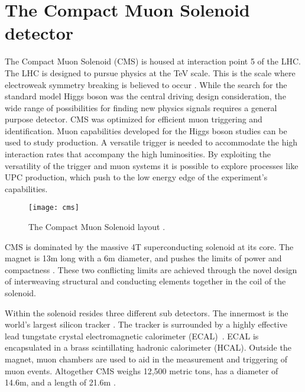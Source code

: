 \chapter{\label{ch:detector} The Compact Muon Solenoid detector}	
  The Compact Muon Solenoid (CMS) is housed at interaction point 5 of the 
    LHC. 
  The LHC is designed to pursue physics at the TeV scale. 
  This is the scale where electroweak symmetry breaking is believed to occur
  	\cite{CmsPTdrv2}.
  While the search for the standard model Higgs boson was the 
    central driving design consideration, the wide range of possibilities for
  	finding new physics signals requires a general purpose detector.
  CMS was optimized for efficient muon triggering and identification. 
  Muon capabilities developed for the Higgs boson studies can be used to study 
    \JPsi{} production. 
  A versatile trigger is needed to accommodate the high interaction rates that 
    accompany the high luminosities. 
  By exploiting the versatility of the trigger and muon systems it
    is possible to explore processes like UPC \JPsi{} production, 
    which push to the low energy edge of the experiment's capabilities. 
  \begin{figure}[h]
    \centering
      \texttt{[image: cms]}
    \caption{The Compact Muon Solenoid layout \cite{tCmsE}.}
    \label{cms}
  \end{figure}
  
  CMS is dominated by the massive 4T 
  	superconducting solenoid at its core.
  The magnet is 13m long with a 6m diameter, and pushes the limits of power
  	and compactness \cite{tCmsE}. 
  These two conflicting limits are achieved through the novel design of 
  	interweaving structural and conducting elements together in the coil of
  	the solenoid.

  Within the solenoid resides three different sub detectors.
  The innermost is the world's largest silicon tracker \cite{tCmsE}.
  The tracker is surrounded by a highly effective lead tungstate crystal 
    electromagnetic calorimeter (ECAL)~\cite{CMS:2002xia}.
  ECAL is encapsulated in a brass scintillating hadronic calorimeter (HCAL).
  Outside the magnet, muon chambers are used to aid in the measurement and 
    triggering of muon events. 
  Altogether CMS weighs 12,500 metric tons, has a diameter of 14.6m,
    and a length of 21.6m \cite{tCmsE}.

